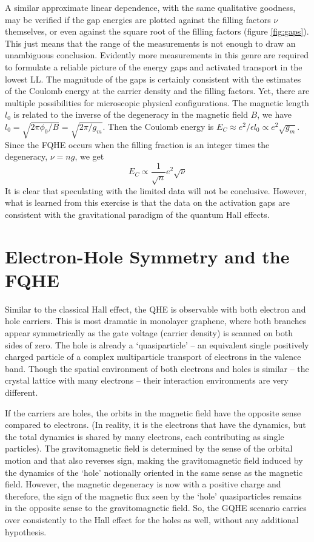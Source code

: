 \documentclass[aps,preprint,12pt,tightenlines]{revtex4}%
\begin{document}
A similar approximate linear dependence, with the same qualitative goodness,
may be verified if the gap energies are plotted against the filling factors
$\nu$ themselves, or even against the square root of the filling factors
(figure \ref{fig:gaps}). This just means that the range of the measurements is
not enough to draw an unambiguous conclusion. Evidently more measurements in
this genre are required to formulate a reliable picture of the energy gaps and
activated transport in the lowest LL. The magnitude of the gaps is
certainly consistent with the estimates of the Coulomb energy at the carrier
density and the filling factors. Yet, there are multiple possibilities for
microscopic physical configurations. The magnetic length $l_{0}$ is related to
the inverse of the degeneracy in the magnetic field $B$, we have $l_{0}%
=\sqrt{2\pi\phi_{0}/B}=\sqrt{2\pi/g_{m}}$. Then the Coulomb energy is
$E_{C}\approx e^{2}/\epsilon l_{0}\propto e^{2}\sqrt{g_{m}}$. Since the FQHE
occurs when the filling fraction is an integer times the degeneracy, $\nu=ng$,
we get
\begin{equation}
E_{C}\propto\frac{1}{\sqrt{n}}e^{2}\sqrt{\nu}
\end{equation}
It is clear that speculating with the limited data will not be conclusive.
However, what is learned from this exercise is that the data on the activation
gaps are consistent with the gravitational paradigm of the quantum Hall effects.

\section{Electron-Hole Symmetry and the FQHE}

Similar to the classical Hall effect, the QHE is observable with both electron
and hole carriers. This is most dramatic in monolayer graphene, where both
branches appear symmetrically as the gate voltage (carrier density) is scanned
on both sides of zero. The hole is already a `quasiparticle' -- an equivalent
single positively charged particle of a complex multiparticle transport of
electrons in the valence band. Though the spatial environment of both
electrons and holes is similar -- the crystal lattice with many electrons --
their interaction environments are very different.

If the carriers are holes, the orbits in the magnetic field have the opposite
sense compared to electrons. (In reality, it is the electrons that have the
dynamics, but the total dynamics is shared by many electrons, each
contributing as single particles). The gravitomagnetic field is determined by
the sense of the orbital motion and that also reverses sign, making the
gravitomagnetic field induced by the dynamics of the `hole' notionally
oriented in the same sense as the magnetic field. However, the magnetic
degeneracy is now with a positive charge and therefore, the sign of the
magnetic flux seen by the `hole' quasiparticles remains in the opposite sense
to the gravitomagnetic field. So, the GQHE scenario carries over consistently
to the Hall effect for the holes as well, without any additional hypothesis.
\end{document}
